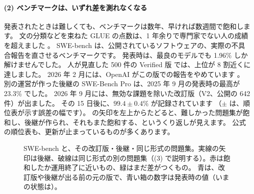 \paragraph{(2) ベンチマークは、いずれ差を測れなくなる}
発表されたときは難しくても、ベンチマークは数年、早ければ数週間で飽和します。
文の分類などを束ねた GLUE \cite{wang2018glue} の点数は、1 年余りで専門家でない人の成績を超えました \cite{wang2019superglue}。
SWE-bench \cite{jimenez2024swebench} は、公開されているソフトウェアの、実際の不具合報告を直させるベンチマークです。
発表時は、最良のモデルでも 1.96\% しか解けませんでした。
人が見直した 500 件の Verified 版 \cite{openai2024sweverified} では、上位が 8 割近くに達しました。
2026 年 2 月には、OpenAI がこの版での報告をやめています \cite{openai2026sweverified}。
別の運営が作った後継の SWE-Bench Pro は、2025 年 9 月の発表時の最高が 23.3\% でした。
2026 年 9 月には、無効な課題を除いた改訂版（V2、公開の 642 件）が出ました。
その 15 日後に、$99.4 \pm 0.4$\% が記録されています \cite{scale2026sweprov2}（$\pm$ は、順位表が示す誤差の幅です）。
の矢印を左上からたどると、難しかった問題集が飽和し、後継が作られ、それもまた飽和する、というくり返しが見えます。
公式の順位表も、更新が止まっているものが多くあります。

\begin{figure}[htbp]
\centering
{}
\caption{SWE-bench と、その改訂版・後継・同じ形式の問題集。実線の矢印は後継、破線は同じ形式の別の問題集（(3) で説明する）。赤は飽和したか運用終了に近いもの、緑はまだ差がつくもの。
青は、改訂版や後継が出る前の元の版で、青い箱の数字は発表時の値（いまの状態は）。}
\label{fig:bm-swe-family}
\end{figure}

